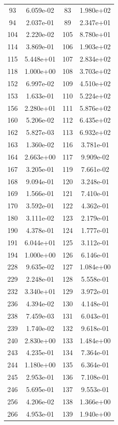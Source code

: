 \documentclass[12pt]{article}
\begin{document}
\begin{longtable}{@{}cccc@{}}
93 & 6.059e-02 & 83 & 1.980e+02 \\
94 & 2.037e-01 & 89 & 2.347e+01 \\
104 & 2.220e-02 & 105 & 8.780e+01 \\
114 & 3.869e-01 & 106 & 1.903e+02 \\
115 & 5.448e+01 & 107 & 2.834e+02 \\
118 & 1.000e+00 & 108 & 3.703e+02 \\
152 & 6.997e-02 & 109 & 4.510e+02 \\
153 & 1.633e-01 & 110 & 5.224e+02 \\
156 & 2.280e+01 & 111 & 5.876e+02 \\
160 & 5.206e-02 & 112 & 6.435e+02 \\
162 & 5.827e-03 & 113 & 6.932e+02 \\
163 & 1.360e-02 & 116 & 3.781e-01 \\
164 & 2.663e+00 & 117 & 9.909e-02 \\
167 & 3.205e-01 & 119 & 7.661e-02 \\
168 & 9.094e-01 & 120 & 3.248e-01 \\
169 & 1.566e-01 & 121 & 7.410e-01 \\
170 & 3.592e-01 & 122 & 4.362e-01 \\
180 & 3.111e-02 & 123 & 2.179e-01 \\
190 & 4.378e-01 & 124 & 1.777e-01 \\
191 & 6.044e+01 & 125 & 3.112e-01 \\
194 & 1.000e+00 & 126 & 6.146e-01 \\
228 & 9.635e-02 & 127 & 1.084e+00 \\
229 & 2.248e-01 & 128 & 5.558e-01 \\
232 & 3.340e+01 & 129 & 3.972e-01 \\
236 & 4.394e-02 & 130 & 4.148e-01 \\
238 & 7.459e-03 & 131 & 6.043e-01 \\
239 & 1.740e-02 & 132 & 9.618e-01 \\
240 & 2.830e+00 & 133 & 1.484e+00 \\
243 & 4.235e-01 & 134 & 7.364e-01 \\
244 & 1.180e+00 & 135 & 6.364e-01 \\
245 & 2.953e-01 & 136 & 7.108e-01 \\
246 & 5.695e-01 & 137 & 9.553e-01 \\
256 & 4.206e-02 & 138 & 1.366e+00 \\
266 & 4.953e-01 & 139 & 1.940e+00 \\

\end{longtable}
\end{document}
